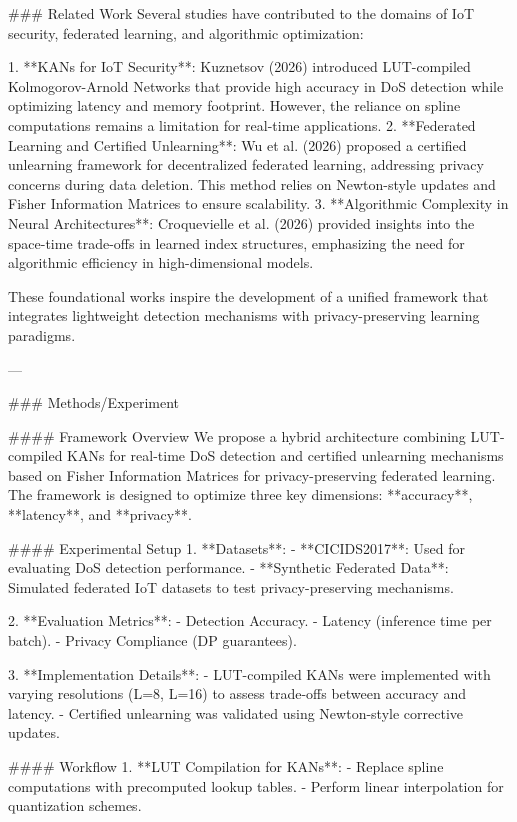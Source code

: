 ### Related Work  
Several studies have contributed to the domains of IoT security, federated learning, and algorithmic optimization:

1. **KANs for IoT Security**: Kuznetsov (2026) introduced LUT-compiled Kolmogorov-Arnold Networks that provide high accuracy in DoS detection while optimizing latency and memory footprint. However, the reliance on spline computations remains a limitation for real-time applications.  
2. **Federated Learning and Certified Unlearning**: Wu et al. (2026) proposed a certified unlearning framework for decentralized federated learning, addressing privacy concerns during data deletion. This method relies on Newton-style updates and Fisher Information Matrices to ensure scalability.  
3. **Algorithmic Complexity in Neural Architectures**: Croquevielle et al. (2026) provided insights into the space-time trade-offs in learned index structures, emphasizing the need for algorithmic efficiency in high-dimensional models.

These foundational works inspire the development of a unified framework that integrates lightweight detection mechanisms with privacy-preserving learning paradigms.

---

### Methods/Experiment  

#### Framework Overview  
We propose a hybrid architecture combining LUT-compiled KANs for real-time DoS detection and certified unlearning mechanisms based on Fisher Information Matrices for privacy-preserving federated learning. The framework is designed to optimize three key dimensions: **accuracy**, **latency**, and **privacy**.

#### Experimental Setup  
1. **Datasets**:  
   - **CICIDS2017**: Used for evaluating DoS detection performance.  
   - **Synthetic Federated Data**: Simulated federated IoT datasets to test privacy-preserving mechanisms.

2. **Evaluation Metrics**:  
   - Detection Accuracy.
   - Latency (inference time per batch).  
   - Privacy Compliance (DP guarantees).

3. **Implementation Details**:  
   - LUT-compiled KANs were implemented with varying resolutions (L=8, L=16) to assess trade-offs between accuracy and latency.  
   - Certified unlearning was validated using Newton-style corrective updates.

#### Workflow  
1. **LUT Compilation for KANs**:
   - Replace spline computations with precomputed lookup tables.
   - Perform linear interpolation for quantization schemes.


